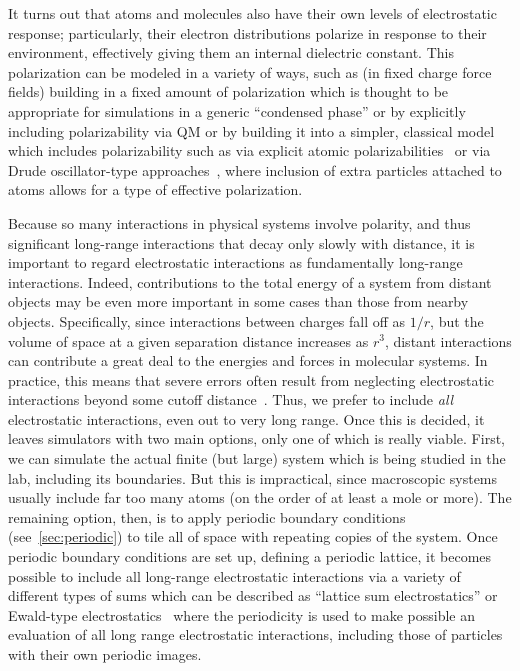 \documentclass[9pt,bestpractices]{livecoms}
\begin{document}
It turns out that atoms and molecules also have their own levels of electrostatic response; particularly, their electron distributions polarize in response to their environment, effectively giving them an internal dielectric constant. 
This polarization can be modeled in a variety of ways, such as (in fixed charge force fields) building in a fixed amount of polarization which is thought to be appropriate for simulations in a generic ``condensed phase'' or by explicitly including polarizability via QM or by building it into a simpler, classical model which includes polarizability such as via explicit atomic polarizabilities~\cite{Ponder2003, Ponder:2010:J.Phys.Chem.B} or via Drude oscillator-type approaches~\cite{Lemkul:2016:Chem.Rev.}, where inclusion of extra particles attached to atoms allows for a type of effective polarization.

Because so many interactions in physical systems involve polarity, and thus significant long-range interactions that decay only slowly with distance, it is important to regard electrostatic interactions as fundamentally long-range interactions.
Indeed, contributions to the total energy of a system from distant objects may be even more important in some cases than those from nearby objects.
Specifically, since interactions between charges fall off as $1/r$, but the volume of space at a given separation distance increases as $r^3$, distant interactions can contribute a great deal to the energies and forces in molecular systems.
In practice, this means that severe errors often result from neglecting electrostatic interactions beyond some cutoff distance~\cite{2001Leach, York:1993:J.Chem.Phys., Darden:1993:J.Chem.Phys., Piana:2012:PLOSONE, Sagui:1999:Annu.Rev.Biophys.Biomol.Struct.}. 
Thus, we prefer to include \emph{all} electrostatic interactions, even out to very long range. 
Once this is decided, it  leaves simulators with two main options, only one of which is really viable.
First, we can simulate the actual finite (but large) system which is being studied in the lab, including its boundaries.
But this is impractical, since macroscopic systems usually include far too many atoms (on the order of at least a mole or more).
The remaining option, then, is to apply periodic boundary conditions (see~\ref{sec:periodic}) to tile all of space with repeating copies of the system. 
Once periodic boundary conditions are set up, defining a periodic lattice, it becomes possible to include all long-range electrostatic interactions via a variety of different types of sums which can be described as ``lattice sum electrostatics'' or Ewald-type electrostatics~\cite{Sagui:1999:Annu.Rev.Biophys.Biomol.Struct., Cisneros:2014:Chem.Rev.} where the periodicity is used to make possible an evaluation of all long range electrostatic interactions, including those of particles with their own periodic images.
\end{document}
